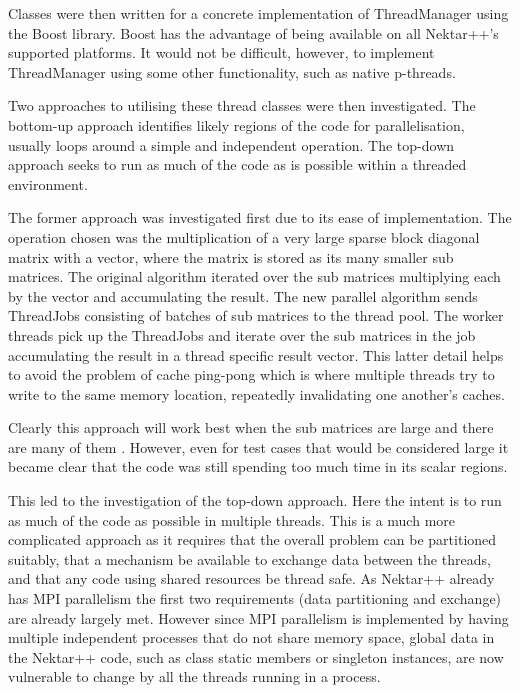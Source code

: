 Classes were then written for a concrete implementation of ThreadManager using
the Boost library.  Boost has the advantage of being available on all Nektar++’s
supported platforms.  It would not be difficult, however, to implement
ThreadManager using some other functionality, such as native p-threads.

Two approaches to utilising these thread classes were then investigated.  The
bottom-up approach identifies likely regions of the code for parallelisation,
usually loops around a simple and independent operation.  The top-down approach
seeks to run as much of the code as is possible within a threaded environment.

The former approach was investigated first due to its ease of implementation. 
The operation chosen was the multiplication of a very large sparse block
diagonal matrix with a vector, where the matrix is stored as its many smaller
sub matrices.  The original algorithm iterated over the sub matrices multiplying
each by the vector and accumulating the result.  The new parallel algorithm
sends ThreadJobs consisting of batches of sub matrices to the thread pool.  The
worker threads pick up the ThreadJobs and iterate over the sub matrices in the
job accumulating the result in a thread specific result vector.  This latter
detail helps to avoid the problem of cache ping-pong which is where multiple
threads try to write to the same memory location, repeatedly invalidating one
another's caches.

Clearly this approach will work best when the sub matrices are large and there
are many of them . However, even for test cases that would be considered large
it became clear that the code was still spending too much time in its scalar
regions.

This led to the investigation of the top-down approach.  Here the intent is to
run as much of the code as possible in multiple threads.  This is a much more
complicated approach as it requires that the overall problem can be partitioned
suitably, that a mechanism be available to exchange data between the threads,
and that any code using shared resources be thread safe.  As Nektar++ already
has MPI parallelism the first two requirements (data partitioning and exchange)
are already largely met.  However since MPI parallelism is implemented by having
multiple independent processes that do not share memory space, global data in
the Nektar++ code, such as class static members or singleton instances, are now
vulnerable to change by all the threads running in a process.

